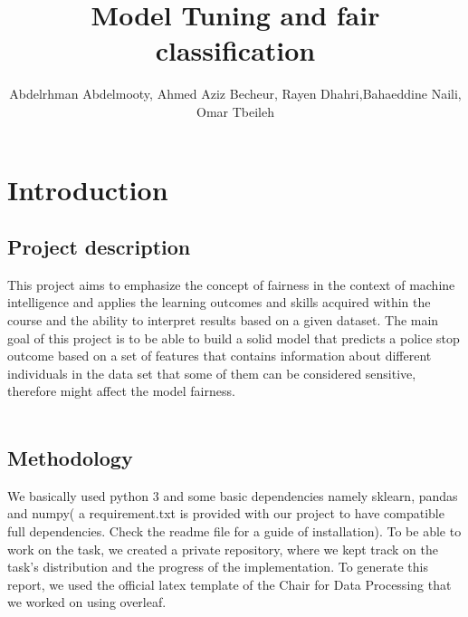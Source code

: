 \documentclass[doctype=studienarbeit,lang=english,BCOR=15mm,biblatex]{ldvbook}
\begin{document}
\title{Model Tuning and fair classification}
\author{Abdelrhman Abdelmooty, Ahmed Aziz Becheur, Rayen Dhahri,Bahaeddine Naili, Omar Tbeileh}



\maketitle[frontcover=Design1]




\tableofcontents






\chapter{Introduction}
\section{Project description}
This project aims to emphasize the concept of fairness in the context of machine intelligence and applies the learning outcomes and skills acquired within the course and the ability to interpret results based on a given dataset.
The main goal of this project is to be able to build a solid model that predicts a police stop outcome based on a set of features that  contains information about different individuals in the data set that some of them can be considered  sensitive, therefore might affect the model fairness. \\\\
\section{Methodology}
We basically used python 3 and some basic dependencies namely sklearn, pandas and numpy( a requirement.txt is provided with our project to have compatible full dependencies. Check the readme file for a guide of installation). To be able to work on the task, we created a private repository, where we kept track on the task’s distribution and the progress of the implementation.
To generate this report, we used the official latex template of the Chair for Data Processing that we worked on using overleaf. 
\end{document}
